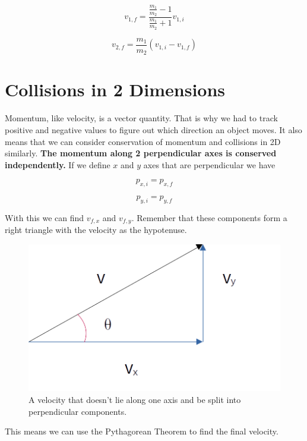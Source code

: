 \documentclass[12pt]{book}
\begin{document}
\begin{equation}
v_{1,f} = \frac{\frac{m_1}{m_2} - 1}{\frac{m_1}{m_2} + 1} v_{1,i}
\end{equation}

\begin{equation}
v_{2,f} = \frac{m_1}{m_2} (v_{1,i} - v_{1,f})
\end{equation}

\section{Collisions in 2 Dimensions}

Momentum, like velocity, is a vector quantity. That is why we had to track positive and negative values to figure out which direction an object moves. It also means that we can consider conservation of momentum and collisions in 2D similarly. \textbf{The momentum along 2 perpendicular axes is conserved independently.} If we define $x$ and $y$ axes that are perpendicular we have 

\begin{equation}
p_{x,i} = p_{x,f}
\end{equation}

\begin{equation}
p_{y,i} = p_{y,f}
\end{equation}

With this we can find $v_{f,x}$ and $v_{f,y}$. Remember that these components form a right triangle with the velocity as the hypotenuse.

\begin{figure}[H]
\centering
\includegraphics[scale=0.4]{Velocity_Angle.png}
\caption{A velocity that doesn't lie along one axis and be split into perpendicular components.}
\end{figure}

This means we can use the Pythagorean Theorem to find the final velocity.
\end{document}
